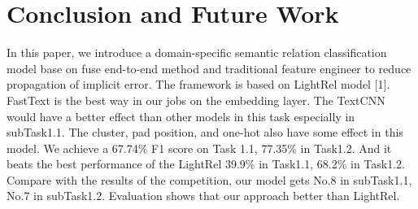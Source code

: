 \section{Conclusion and Future Work}
\label{sec:conclusion_and_future_work}
In this paper, we introduce a domain-specific semantic relation classification model base on fuse end-to-end method and traditional feature engineer to reduce propagation of implicit error. The framework is based on LightRel model [1]. FastText is the best way in our jobs on the embedding layer. The TextCNN would have a better effect than other models in this task especially in subTask1.1. The cluster, pad position, and one-hot also have some effect in this model. We achieve a 67.74\% F1 score on Task 1.1, 77.35\% in Task1.2. And it beats the best performance of the LightRel 39.9\% in Task1.1, 68.2\% in Task1.2. Compare with the results of the competition, our model gets No.8 in subTask1.1, No.7 in subTask1.2.  Evaluation shows that our approach better than LightRel.